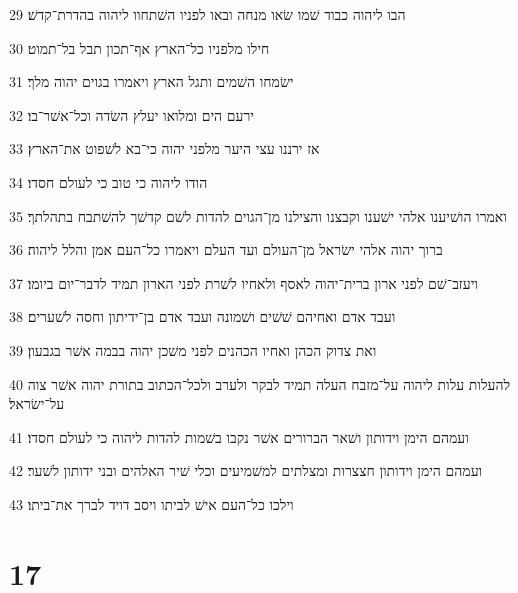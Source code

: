 \par 29 הבו ליהוה כבוד שׁמו שׂאו מנחה ובאו לפניו השׁתחוו ליהוה בהדרת־קדשׁ׃
\par 30 חילו מלפניו כל־הארץ אף־תכון תבל בל־תמוט׃
\par 31 ישׂמחו השׁמים ותגל הארץ ויאמרו בגוים יהוה מלך׃
\par 32 ירעם הים ומלואו יעלץ השׂדה וכל־אשׁר־בו׃
\par 33 אז ירננו עצי היער מלפני יהוה כי־בא לשׁפוט את־הארץ׃
\par 34 הודו ליהוה כי טוב כי לעולם חסדו׃
\par 35 ואמרו הושׁיענו אלהי ישׁענו וקבצנו והצילנו מן־הגוים להדות לשׁם קדשׁך להשׁתבח בתהלתך׃
\par 36 ברוך יהוה אלהי ישׂראל מן־העולם ועד העלם ויאמרו כל־העם אמן והלל ליהוה׃
\par 37 ויעזב־שׁם לפני ארון ברית־יהוה לאסף ולאחיו לשׁרת לפני הארון תמיד לדבר־יום ביומו׃
\par 38 ועבד אדם ואחיהם שׁשׁים ושׁמונה ועבד אדם בן־ידיתון וחסה לשׁערים׃
\par 39 ואת צדוק הכהן ואחיו הכהנים לפני משׁכן יהוה בבמה אשׁר בגבעון׃
\par 40 להעלות עלות ליהוה על־מזבח העלה תמיד לבקר ולערב ולכל־הכתוב בתורת יהוה אשׁר צוה על־ישׂראל׃
\par 41 ועמהם הימן וידותון ושׁאר הברורים אשׁר נקבו בשׁמות להדות ליהוה כי לעולם חסדו׃
\par 42 ועמהם הימן וידותון חצצרות ומצלתים למשׁמיעים וכלי שׁיר האלהים ובני ידותון לשׁער׃
\par 43 וילכו כל־העם אישׁ לביתו ויסב דויד לברך את־ביתו׃

\chapter{17}

